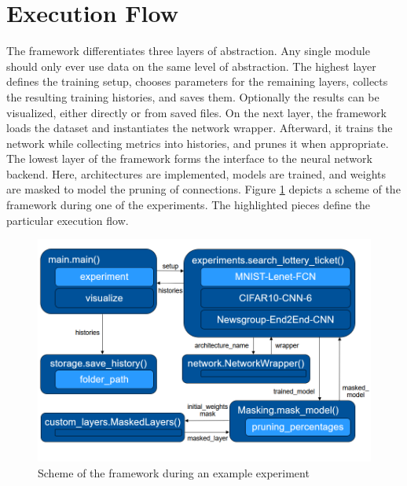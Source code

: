 
\section{Execution Flow}
The framework differentiates three layers of abstraction. Any single module should only ever use data on the same level of abstraction.
The highest layer defines the training setup, chooses parameters for the remaining layers, collects the resulting training histories, and saves them. Optionally the results can be visualized, either directly or from saved files. 
On the next layer, the framework loads the dataset and instantiates the network wrapper. Afterward, it trains the network while collecting metrics into histories, and prunes it when appropriate.
The lowest layer of the framework forms the interface to the neural network backend. Here, architectures are implemented, models are trained, and weights are masked to model the pruning of connections.
Figure \ref{fig:Example Control Flow} depicts a scheme of the framework during one of the experiments. The highlighted pieces define the particular execution flow.
\begin{figure}
	\centering
	\includegraphics[width=450px]{gfx/chp_5_control_flow.png}
	\caption{Scheme of the framework during an example experiment}
	\label{fig:Example Control Flow}
\end{figure}

